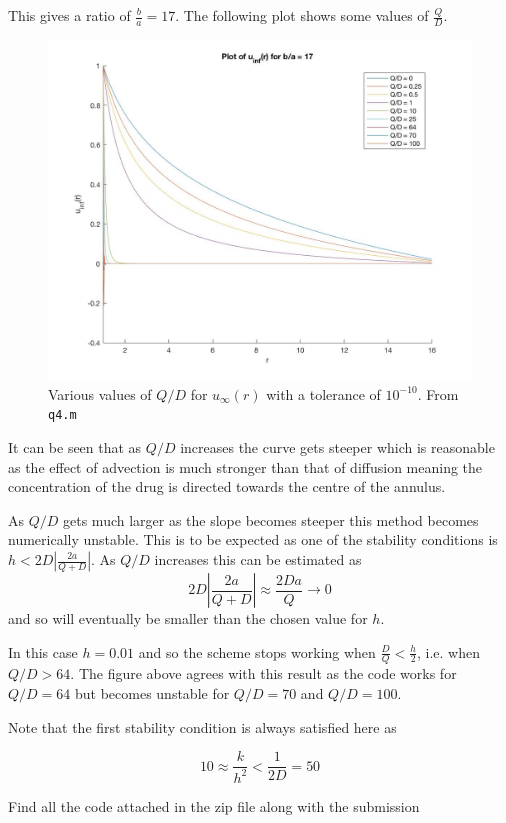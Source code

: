 \documentclass{article}
\begin{document}
\begin{enumerate}
	This gives a ratio of $\frac{b}{a} = 17$. The following plot shows some values of $\frac{Q}{D}$.
	
	\begin{figure}[h!]
		\centering
		\includegraphics[width = \textwidth]{fig_q4.jpg}
		
		\caption{Various values of $Q/D$ for $u_\infty(r)$ with a tolerance of $10^{-10}$. From \texttt{q4.m}}
	\end{figure}
	
	It can be seen that as $Q/D$ increases the curve gets steeper which is reasonable as the effect of advection is much stronger than that of diffusion meaning the concentration of the drug is directed towards the centre of the annulus. 
	
	As $Q/D$ gets much larger as the slope becomes steeper this method becomes numerically unstable. This is to be expected as one of the stability conditions is $h < 2D|\frac{2a}{Q+D}|$. As $Q/D$ increases this can be estimated as $$ 2D|\frac{2a}{Q+D}| \approx \frac{2Da}{Q} \rightarrow 0$$ and so will eventually be smaller than the chosen value for $h$.
	
	In this case $h = 0.01$ and so the scheme stops working when $\frac{D}{Q} < \frac{h}{2}$, i.e. when $Q/D > 64$. The figure above agrees with this result as the code works for $Q/D = 64$ but becomes unstable for $Q/D = 70$ and $Q/D = 100$.

	Note that the first stability condition is always satisfied here as 
	
	\begin{equation*}
		10 \approx \frac{k}{h^2} < \frac{1}{2D} = 50
	\end{equation*}
	
\end{enumerate}

	Find all the code attached in the zip file along with the submission
\end{document}

